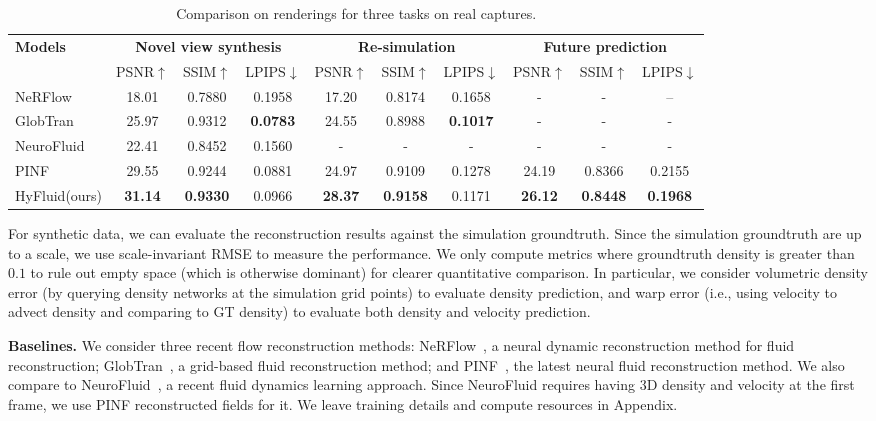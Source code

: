 \documentclass{article}
\newcommand{\semismall}{\fontsize{8.5pt}{10pt}\selectfont}
\newcommand{\model}{HyFluid\xspace}
\newcommand{\myparagraph}[1]{\vspace{0.1cm}\noindent\textbf{#1}}
\begin{document}
\begin{table}[t]
\centering
\semismall
\setlength{\tabcolsep}{3pt}
    \begin{tabular}{lccccccccc}
    \toprule
    \multirow{2}{*}{\bf Models} & \multicolumn{3}{c}{\bf Novel view synthesis} & \multicolumn{3}{c}{\bf Re-simulation} & \multicolumn{3}{c}{\bf Future prediction} \\
    \cmidrule(lr){2-4}\cmidrule(lr){5-7}\cmidrule(lr){8-10}
     & PSNR$\uparrow$ & SSIM$\uparrow$ & LPIPS$\downarrow$ & PSNR$\uparrow$ & SSIM$\uparrow$ & LPIPS$\downarrow$& PSNR$\uparrow$ & SSIM$\uparrow$ & LPIPS$\downarrow$ \\
    \midrule
    NeRFlow~\citep{du2021neural} & 18.01 & 0.7880 & 0.1958 &  17.20 & 0.8174 & 0.1658  & - & - & -- \\
    GlobTran~\citep{franz2021global} & 25.97 & 0.9312 & \textbf{0.0783} & 24.55 & 0.8988 & \textbf{0.1017} & - & - & - \\
    NeuroFluid~\citep{guan2022neurofluid} & 22.41	& 0.8452 & 0.1560 &-&-&-&-&-&- \\
    PINF~\citep{chu2022physics}  & 29.55 & 0.9244 &0.0881  & 24.97  & 0.9109 & 0.1278  & 24.19 & 0.8366 & 0.2155 \\
    \model (ours) &  \textbf{31.14} & \textbf{0.9330}	& 0.0966 &  \textbf{28.37}& \textbf{0.9158} &  0.1171 & \textbf{26.12} & \textbf{0.8448} &  \textbf{0.1968}\\
    \bottomrule
    \end{tabular}
\vspace{5pt}
\caption{Comparison on renderings for three tasks on real captures.}
\vspace{-0.25cm}
\label{tbl:main}
\end{table} 
For synthetic data, we can evaluate the reconstruction results against the simulation groundtruth. Since the simulation groundtruth are up to a scale, we use scale-invariant RMSE to measure the performance. We only compute metrics where groundtruth density is greater than $0.1$ to rule out empty space (which is otherwise dominant) for clearer quantitative comparison. In particular, we consider volumetric density error (by querying density networks at the simulation grid points) to evaluate density prediction, and warp error (i.e., using velocity to advect density and comparing to GT density) to evaluate both density and velocity prediction. 

\myparagraph{Baselines.} We consider three recent flow reconstruction methods: NeRFlow~\citep{du2021neural}, a neural dynamic reconstruction method for fluid reconstruction;
GlobTran~\citep{franz2021global}, a grid-based fluid reconstruction method;
and PINF~\citep{chu2022physics}, the latest neural fluid reconstruction method.
We also compare to NeuroFluid~\citep{guan2022neurofluid}, a recent fluid dynamics learning approach. Since NeuroFluid requires having 3D density and velocity at the first frame, we use PINF reconstructed fields for it.
We leave training details and compute resources in Appendix.
\end{document}
